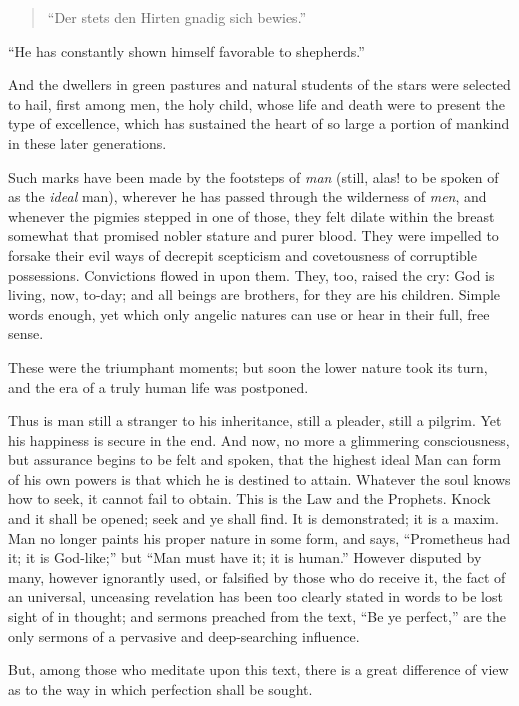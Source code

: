 \begin{verse}
``Der stets den Hirten gnadig sich bewies.''
\end{verse}

\noindent ``He has constantly shown himself favorable to
shepherds.''

And the dwellers in green pastures and natural students of the stars
were selected to hail, first among men, the holy child, whose life and
death were to present the type of excellence, which has sustained the
heart of so large a portion of mankind in these later generations.

Such marks have been made by the footsteps of \textit{man} (still,
alas! to be spoken of as the \textit{ideal} man), wherever he has
passed through the wilderness of \textit{men}, and whenever the
pigmies stepped in one of those, they felt dilate within the breast
somewhat that promised nobler stature and purer blood. They were
impelled to forsake their evil ways of decrepit scepticism and
covetousness of corruptible possessions. Convictions flowed in upon
them. They, too, raised the cry: God is living, now, to-day; and all
beings are brothers, for they are his children. Simple words enough,
yet which only angelic natures can use or hear in their full, free
sense.

These were the triumphant moments; but soon the lower nature took its
turn, and the era of a truly human life was postponed.

Thus is man still a stranger to his inheritance, still a
pleader, still a pilgrim. Yet his happiness is secure in the end. And
now, no more a glimmering consciousness, but assurance begins to be
felt and spoken, that the highest ideal Man can form of his own powers
is that which he is destined to attain. Whatever the soul knows how to
seek, it cannot fail to obtain. This is the Law and the Prophets.
Knock and it shall be opened; seek and ye shall find. It is
demonstrated; it is a maxim. Man no longer paints his proper nature in
some form, and says, ``Prometheus had it; it is God-like;'' but ``Man
must have it; it is human.'' However disputed by many, however
ignorantly used, or falsified by those who do receive it, the fact of
an universal, unceasing revelation has been too clearly stated in
words to be lost sight of in thought; and sermons preached from the
text, ``Be ye perfect,'' are the only sermons of a pervasive and
deep-searching influence.

But, among those who meditate upon this text, there is a great
difference of view as to the way in which perfection shall be sought.

